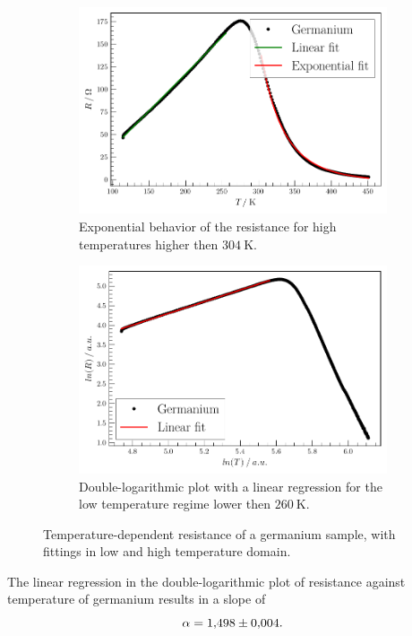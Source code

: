 \begin{figure}
    \centering
\begin{subfigure}{.45\textwidth}
    \centering
    \includegraphics[width=\textwidth]{plots/R1.pdf}
    \caption{Exponential behavior of the resistance for high temperatures higher then $\SI{304}{\kelvin}$.}
    \label{fig:Ge-exp}
\end{subfigure}
\begin{subfigure}{.45\textwidth}
    \centering
    \includegraphics[width=\textwidth]{plots/R1-log.pdf}
  \caption{Double-logarithmic plot with a linear regression for the low temperature regime lower then $\SI{260}{\kelvin}$.}
    \label{fig:Ge-log}
\end{subfigure}
\caption{Temperature-dependent resistance of a germanium sample, with fittings in low and high temperature domain.}
\label{fig:semiconductor-fit}
\end{figure}

The linear regression in the double-logarithmic plot of resistance against temperature of germanium results in a slope of
\begin{equation}
    \alpha = \num{1.498 \pm 0.004}.
\end{equation}